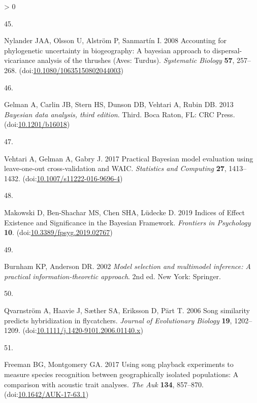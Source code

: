 \documentclass[
  a4paper,
]{article}
\newlength{\cslhangindent}
\newlength{\csllabelwidth}
\newenvironment{CSLReferences}[2] %
 {%
  \setlength{\parindent}{0pt}
  \ifodd #1 \everypar{\setlength{\hangindent}{\cslhangindent}}\ignorespaces\fi
  \ifnum #2 > 0
  \setlength{\parskip}{#2\baselineskip}
  \fi
 }%
 {}
\newcommand{\CSLLeftMargin}[1]{\parbox[t]{\csllabelwidth}{#1}}
\newcommand{\CSLRightInline}[1]{\parbox[t]{\linewidth - \csllabelwidth}{#1}\break}
\begin{document}
\begin{CSLReferences}{0}{0}
\leavevmode\hypertarget{ref-nylander2008}{}%
\CSLLeftMargin{45. }
\CSLRightInline{Nylander JAA, Olsson U, Alström P, Sanmartín I. 2008
Accounting for phylogenetic uncertainty in biogeography: {A} bayesian
approach to dispersal-vicariance analysis of the thrushes ({Aves}:
{Turdus}). \emph{Systematic Biology} \textbf{57}, 257--268.
(doi:\href{https://doi.org/10.1080/10635150802044003}{10.1080/10635150802044003})}

\leavevmode\hypertarget{ref-gelman2013}{}%
\CSLLeftMargin{46. }
\CSLRightInline{Gelman A, Carlin JB, Stern HS, Dunson DB, Vehtari A,
Rubin DB. 2013 \emph{Bayesian data analysis, third edition}. Third.
{Boca Raton, FL}: {CRC Press}.
(doi:\href{https://doi.org/10.1201/b16018}{10.1201/b16018})}

\leavevmode\hypertarget{ref-vehtari2017}{}%
\CSLLeftMargin{47. }
\CSLRightInline{Vehtari A, Gelman A, Gabry J. 2017 Practical {Bayesian}
model evaluation using leave-one-out cross-validation and {WAIC}.
\emph{Statistics and Computing} \textbf{27}, 1413--1432.
(doi:\href{https://doi.org/10.1007/s11222-016-9696-4}{10.1007/s11222-016-9696-4})}

\leavevmode\hypertarget{ref-makowski2019}{}%
\CSLLeftMargin{48. }
\CSLRightInline{Makowski D, Ben-Shachar MS, Chen SHA, Lüdecke D. 2019
Indices of {Effect Existence} and {Significance} in the {Bayesian
Framework}. \emph{Frontiers in Psychology} \textbf{10}.
(doi:\href{https://doi.org/10.3389/fpsyg.2019.02767}{10.3389/fpsyg.2019.02767})}

\leavevmode\hypertarget{ref-burnham2002}{}%
\CSLLeftMargin{49. }
\CSLRightInline{Burnham KP, Anderson DR. 2002 \emph{Model selection and
multimodel inference: {A} practical information-theoretic approach}. 2nd
ed. {New York}: {Springer}. }

\leavevmode\hypertarget{ref-qvarnstrom2006}{}%
\CSLLeftMargin{50. }
\CSLRightInline{Qvarnström A, Haavie J, Sæther SA, Eriksson D, Pärt T.
2006 Song similarity predicts hybridization in flycatchers.
\emph{Journal of Evolutionary Biology} \textbf{19}, 1202--1209.
(doi:\href{https://doi.org/10.1111/j.1420-9101.2006.01140.x}{10.1111/j.1420-9101.2006.01140.x})}

\leavevmode\hypertarget{ref-freeman2017}{}%
\CSLLeftMargin{51. }
\CSLRightInline{Freeman BG, Montgomery GA. 2017 Using song playback
experiments to measure species recognition between geographically
isolated populations: {A} comparison with acoustic trait analyses.
\emph{The Auk} \textbf{134}, 857--870.
(doi:\href{https://doi.org/10.1642/AUK-17-63.1}{10.1642/AUK-17-63.1})}


\end{CSLReferences}
\end{document}
